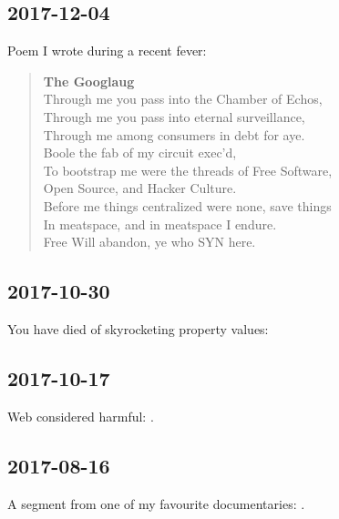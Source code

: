 \documentclass{article}
\begin{document}
\subsection{2017-12-04}
Poem I wrote during a recent fever:
\begin{center}
\begin{verse}
{\large\textbf{The Googlaug}} \\
Through me you pass into the Chamber of Echos, \\
Through me you pass into eternal surveillance, \\
Through me among consumers in debt for aye. \\
Boole the fab of my circuit exec'd, \\
To bootstrap me were the threads of Free Software, \\
Open Source, and Hacker Culture. \\
Before me things centralized were none, save things \\
In meatspace, and in meatspace I endure. \\
Free Will abandon, ye who SYN here.
\end{verse}
\end{center}

\subsection{2017-10-30}
You have died of skyrocketing property values: 

\subsection{2017-10-17}
Web considered harmful: .

\subsection{2017-08-16}
A segment from one of my favourite documentaries: .
\end{document}
